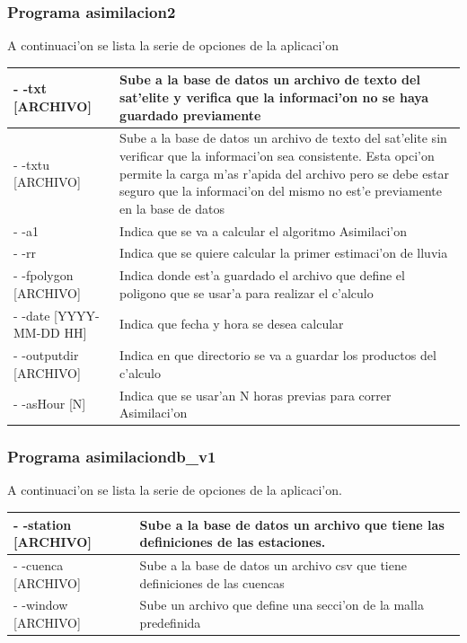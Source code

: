 \subsubsection*{Programa asimilacion2}
A continuaci'on se lista la serie de opciones de la aplicaci'on
\begin{center}
  \begin{tabular}{|l|p{9cm}|}
  \hline
  - -txt [ARCHIVO] & Sube a la base de datos un archivo de texto del sat'elite y verifica que la 
		      informaci'on no se haya guardado previamente\\ \hline 
  - -txtu [ARCHIVO] & Sube a la base de datos un archivo de texto del sat'elite sin verificar que 
		      la informaci'on sea consistente. Esta opci'on permite la carga m'as r'apida del archivo pero se debe estar seguro que
		      la informaci'on del mismo no est'e previamente en la base de datos\\ \hline
  - -a1 & Indica que se va a calcular el algoritmo Asimilaci'on \\ \hline
  - -rr & Indica que se quiere calcular la primer estimaci'on de lluvia \\ \hline
  - -fpolygon [ARCHIVO] & Indica donde est'a guardado el archivo que define el poligono que se usar'a para realizar el c'alculo \\ \hline
  - -date [YYYY-MM-DD HH] & Indica que fecha y hora se desea calcular \\ \hline
  - -outputdir [ARCHIVO] & Indica en que directorio se va a guardar los productos del c'alculo \\ \hline
  - -asHour [N] & Indica que se usar'an N horas previas para correr Asimilaci'on \\ \hline 
  \end{tabular} 
\end{center}

\subsubsection*{Programa asimilaciondb\_v1}
A continuaci'on se lista la serie de opciones de la aplicaci'on.\\
\begin{center}
  \begin{tabular}{|l|p{9cm}|}
  \hline
  - -station [ARCHIVO] & Sube a la base de datos un archivo que tiene las definiciones de las estaciones.\\ \hline 
  - -cuenca [ARCHIVO] & Sube a la base de datos un archivo csv que tiene definiciones de las cuencas\\ \hline
  - -window [ARCHIVO] & Sube un archivo que define una secci'on de la malla predefinida \\
  \hline 
  \end{tabular} 
\end{center}
